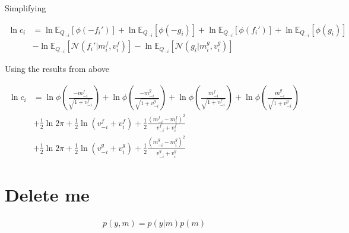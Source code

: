 \documentclass[10pt,a4paper]{article}
\begin{document}
Simplifying

\begin{align}
	\ln c_i &= \ln \mathbb{E}_{Q_{-i}}\left[\phi\left(-f_i'\right)\right] + \ln \mathbb{E}_{Q_{-i}}\left[\phi(-g_i)\right] + \ln \mathbb{E}_{Q_{-i}}\left[\phi\left(f_i'\right)\right] + \ln \mathbb{E}_{Q_{-i}}\left[ \phi(g_i)\right]\\
	& - \ln \mathbb{E}_{Q_{-i}}\left[\mathcal{N}\left(f_i'|m^f_i, v^f_i\right)\right] - \ln \mathbb{E}_{Q_{-i}}\left[\mathcal{N}\left(g_i|m^g_i, v^g_i\right)\right]
\end{align}

Using the results from above

\begin{align}
	\ln c_i &= \ln \phi\left(\frac{-m^f_{-i}}{\sqrt{1 + v^f_{-i}}}\right) + \ln \phi\left(\frac{-m^g_{-i}}{\sqrt{1 + v^g_{-i}}}\right)  + \ln \phi\left(\frac{m^f_{-i}}{\sqrt{1 + v^f_{-i}}}\right) + \ln \phi\left(\frac{m^g_{-i}}{\sqrt{1 + v^g_{-i}}}\right) \\
	& +\frac12 \ln2\pi + \frac12 \ln\left(v^f_{-i} + v^f_i\right) + \frac12\frac{(m^f_{-i} - m^f_i)^2}{v^f_{-i} + v^f_i}  \\
	& +\frac12 \ln2\pi + \frac12 \ln\left(v^g_{-i} + v^g_i\right) + \frac12\frac{(m^g_{-i} - m^g_i)^2}{v^g_{-i} + v^g_i}
\end{align}

\section*{Delete me}

\begin{align}
	p(y, m) = p(y|m)p(m)
\end{align}
\end{document}

